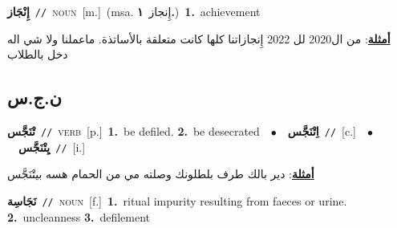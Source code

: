 \documentclass[10pt,a4paper,twoside]{article} %
\begin{document}
\begin{multicols}{2}
{\setlength\topsep{0pt}\textbf{\foreignlanguage{arabic}{إِنْجَاز}}\ {\color{gray}\texttt{//}\color{black}}\ \textsc{noun}\ [m.]\ \color{gray}(msa. \foreignlanguage{arabic}{إِنجاز}~\foreignlanguage{arabic}{\textbf{١.}})\color{black}\ \textbf{1.}~achievement\  \begin{flushright}\color{gray}\foreignlanguage{arabic}{\textbf{\underline{\foreignlanguage{arabic}{أمثلة}}}: من ال2020 لل 2022 إِنجازاتنا كلها كانت متعلقة بالأساتذة. ماعملنا ولا شي اله دخل بالطلاب}\end{flushright}\color{black}} \vspace{2mm}

\vspace{-3mm}
\subsection*{\color{blue}\foreignlanguage{arabic}{ن.ج.س}\color{blue}{}} 

{\setlength\topsep{0pt}\textbf{\foreignlanguage{arabic}{تْنَجَّس}}\ {\color{gray}\texttt{//}\color{black}}\ \textsc{verb}\ [p.]\ \textbf{1.}~be defiled.  \textbf{2.}~be desecrated\ \ $\bullet$\ \ \setlength\topsep{0pt}\textbf{\foreignlanguage{arabic}{اِتْنَجَّس}}\ {\color{gray}\texttt{//}\color{black}}\ [c.]\ \ $\bullet$\ \ \setlength\topsep{0pt}\textbf{\foreignlanguage{arabic}{يِتْنَجَّس}}\ {\color{gray}\texttt{//}\color{black}}\ [i.]\  \begin{flushright}\color{gray}\foreignlanguage{arabic}{\textbf{\underline{\foreignlanguage{arabic}{أمثلة}}}: دير بالك طرف بلطلونك وصلته مي من الحمام هسه بيتْنَجَّس}\end{flushright}\color{black}} \vspace{2mm}

{\setlength\topsep{0pt}\textbf{\foreignlanguage{arabic}{نَجَاسِة}}\ {\color{gray}\texttt{//}\color{black}}\ \textsc{noun}\ [f.]\ \textbf{1.}~ritual impurity resulting from faeces or urine.  \textbf{2.}~uncleanness  \textbf{3.}~defilement\ } \vspace{2mm}


\end{multicols}
\end{document}
